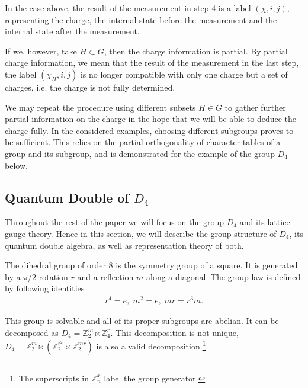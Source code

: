 \documentclass[two column]{article}
\begin{document}
In the case above, the result of the measurement in step 4 is a label $(\chi, i, j)$, representing the charge, the internal state before the measurement and the internal state after the measurement.

If we, however, take $H \subset G$, then the charge information is partial.
By partial charge information, we mean that the result of the measurement in the last step, the label $(\chi_H, i, j)$ is no longer compatible with only one charge but a set of charges, i.e. the charge is not fully determined.

We may repeat the procedure using different subsets $H \in G$ to gather further partial information on the charge in the hope that we will be able to deduce the charge fully. In the considered examples, choosing different subgroups proves to be sufficient. This relies on the partial orthogonality of character tables of a group and its subgroup, and is demonstrated for the example of the group $D_4$ below.

\subsection{Quantum Double of $D_4$}

Throughout the rest of the paper we will focus on the group $D_4$ and its lattice gauge theory.
Hence in this section, we will describe the group structure of $D_4$, its quantum double algebra, as well as representation theory of both.

The dihedral group of order 8 is the symmetry group of a square. It is generated by a $\pi/2$-rotation $r$ and a reflection  $m$ along a diagonal.
The group law is defined by following identities
\begin{equation}
	\begin{split}
		r^4 = e,\;
		m^2 = e,	\;	mr = r^3m. \label{eqn:group}
	\end{split}
\end{equation}

This group is solvable and all of its proper subgroups are abelian. It can be decomposed as $D_4 = \mathbb{Z}^m_2 \ltimes \mathbb{Z}^r_4$.
This decomposition is not unique, $D_4 = \mathbb{Z}_2^m\ltimes(\mathbb{Z}_2^{r^2}\times\mathbb{Z}^{mr}_2)$ is also a valid decomposition.\footnote{The superscripts in $\mathbb{Z}_n^x$ label the group generator.}
\end{document}
